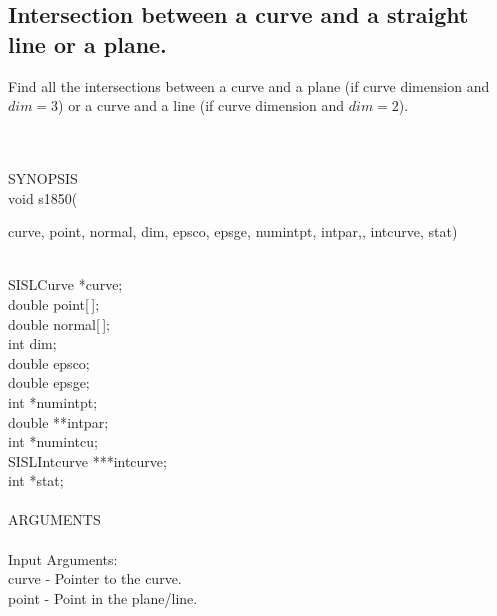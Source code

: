 \subsection{\sloppy Intersection between a curve and a straight line or a plane.}
\begin{minipg1}
        Find all the intersections between a curve and a plane (if
        curve dimension and $dim=3$)
        or a curve and a line (if curve dimension and $dim=2$).
\end{minipg1} \\ \\
SYNOPSIS\\
        \>void s1850(\begin{minipg3}
        {\fov curve}, {\fov point}, {\fov normal}, {\fov dim}, {\fov epsco}, {\fov epsge}, {\fov numintpt},
        {\fov intpar},, {\fov intcurve}, {\fov stat})
                \end{minipg3}\\[0.3ex]
                \>\>    SISLCurve       \>      *{\fov curve};\\
                \>\>    double  \>      {\fov point}[\,];\\
                \>\>    double  \>      {\fov normal}[\,];\\
                \>\>    int     \>      {\fov dim};\\
                \>\>    double  \>      {\fov epsco};\\
                \>\>    double  \>      {\fov epsge};\\
                \>\>    int     \>      *{\fov numintpt};\\
                \>\>    double  \>      **{\fov intpar};\\
                \>\>    int     \>      *{\fov numintcu};\\
                \>\>    SISLIntcurve \> ***{\fov intcurve};\\
                \>\>    int     \>      *{\fov stat};\\
\\
ARGUMENTS\\
\\
        \>Input Arguments:\\
        \>\>    {\fov curve}    \> - \> Pointer to the curve.\\
        \>\>    {\fov point}    \> - \> Point in the plane/line.\\
